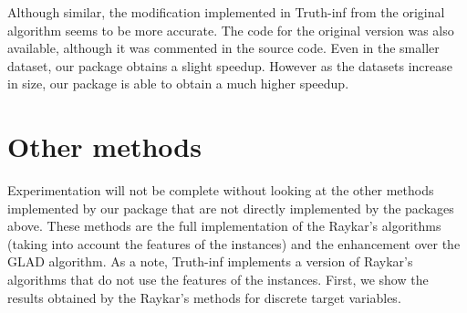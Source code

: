 \documentclass[letterpaper,10pt,english]{sphinxmanual}
\begin{document}
Although similar, the modification implemented in Truth-inf from the original algorithm seems to be more
accurate. The code for the original version was also available, although it was commented in the source code.
Even in the smaller dataset, our package obtains a slight speedup. However as the datasets increase in size,
our package is able to obtain a much higher speedup. 

\section{Other methods}
\label{\detokenize{package/other:other-methods}}
Experimentation will not be complete without looking at the other methods implemented by our package that
are not directly implemented by the packages above. These methods are the full implementation of the Raykar’s
algorithms (taking into account the features of the instances) and the enhancement over the GLAD algorithm. As a
note, Truth-inf implements a version of Raykar’s algorithms that do not use the features of the instances. First,
we show the results obtained by the Raykar’s methods for discrete target variables.
\end{document}
